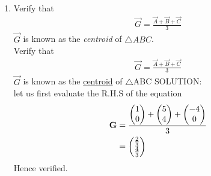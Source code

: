 \documentclass[11pt]{book}
\begin{document}
\begin{enumerate}[label=\thesection.\arabic*.,ref=\thesection.\theenumi]
\item Verify that 
		\begin{align}
			\vec{G}=\frac{\vec{A}+\vec{B}+\vec{C}}{3}
		\end{align}
$\vec{G}$ is known as the {\em centroid} of $\triangle ABC$.\\
Verify that\\
\begin{align}
 \vec{G}=\frac{\vec{A}+\vec{B}+\vec{C}}{3}   
\end{align}
$\vec{G}$ is known as the \underline{centroid} of $\triangle$ABC 
SOLUTION:\\
let us first evaluate the R.H.S of the equation
\begin{equation}
\begin{split}
\label{eq:centroid}
    \vec{G}&= \frac{\myvec{1\\0}+\myvec{5\\4}+\myvec{-4\\0}}{3}\\   
     &= \myvec{\frac{2}{3}\\ \frac{4}{3}}
\end{split}
\end{equation}
Hence verified.



\end{enumerate}
\end{document}
